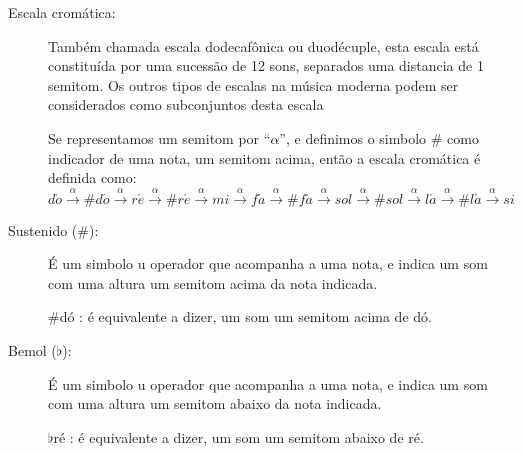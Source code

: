 \begin{description}
\item [Escala cromática:] \label{sec:pos:Cromatica}
Também chamada escala dodecafônica ou duodécuple, 
esta escala está constituída por uma sucessão de 12 sons, separados uma distancia de 1 semitom.
Os outros tipos de escalas na música moderna podem ser considerados como subconjuntos desta escala \cite[pp. 753]{apel1969harvard}
\begin{example} 
Se representamos um semitom por ``$\alpha$'', 
e definimos o simbolo $\#$ como indicador de uma nota, um semitom acima, 
então a escala cromática é definida como:
\begin{equation*} 
d\acute{o}\overset{\alpha}{\rightarrow}
\#d\acute{o}\overset{\alpha}{\rightarrow}
r\acute{e}\overset{\alpha}{\rightarrow}
\#r\acute{e}\overset{\alpha}{\rightarrow}
mi\overset{\alpha}{\rightarrow}
f\acute{a}\overset{\alpha}{\rightarrow}
\#f\acute{a}\overset{\alpha}{\rightarrow}
sol\overset{\alpha}{\rightarrow}
\#sol\overset{\alpha}{\rightarrow}
l\acute{a}\overset{\alpha}{\rightarrow}
\#l\acute{a}\overset{\alpha}{\rightarrow}
si
\end{equation*}
\end{example}

\item [Sustenido ($\#$):] \label{sec:pos:Sustenido}
É um simbolo u operador que acompanha a uma nota, e indica um som com uma altura um semitom acima da nota indicada. 
\begin{example} $\#$dó : é equivalente a dizer, um som um semitom acima de dó.
\end{example}


\item [Bemol ($\flat$):] \label{sec:pos:Bemol}
É um simbolo u operador que acompanha a uma nota, e indica um som com uma altura um semitom abaixo da nota indicada. 
\begin{example} $\flat$ré : é equivalente a dizer, um som um semitom abaixo de ré.
\end{example}

\end{description}~\\

